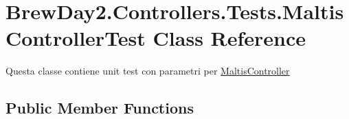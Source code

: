 \hypertarget{class_brew_day2_1_1_controllers_1_1_tests_1_1_maltis_controller_test}{}\section{Brew\+Day2.\+Controllers.\+Tests.\+Maltis\+Controller\+Test Class Reference}
\label{class_brew_day2_1_1_controllers_1_1_tests_1_1_maltis_controller_test}


Questa classe contiene unit test con parametri per \mbox{\hyperlink{class_brew_day2_1_1_controllers_1_1_maltis_controller}{Maltis\+Controller}} 


\subsection*{Public Member Functions}
